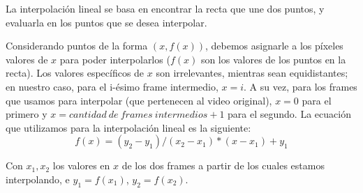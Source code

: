 \par La interpolaci\'on lineal se basa en encontrar la recta que une dos puntos, y evaluarla en los puntos que se desea interpolar.
\par Considerando puntos de la forma $(x, f(x))$, debemos asignarle a los p\'ixeles valores de $x$ para poder interpolarlos ($f(x)$ son los valores de los puntos en la recta).
Los valores espec\'ificos de $x$ son irrelevantes, mientras sean equidistantes; en nuestro caso, para el i-\'esimo frame intermedio, $x = i$. 
A su vez, para los frames que usamos para interpolar (que pertenecen al video original), $x = 0$ para el primero y $x = cantidad\ de\ frames\ intermedios + 1$ para el segundo.
\newline La ecuaci\'on que utilizamos para la interpolaci\'on lineal es la siguiente:
\begin{equation}
f(x) = (y_2 - y_1)/(x_2 - x_1) * (x - x_1) + y_1
\end{equation}
\par Con $x_1, x_2$ los valores en $x$ de los dos frames a partir de los cuales estamos interpolando, e $y_1 = f(x_1)$, $y_2 = f(x_2)$.
